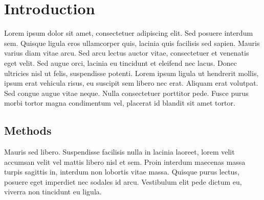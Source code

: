 \documentclass{prace}
\begin{document}
\section{Introduction}

Lorem ipsum dolor sit amet, consectetuer adipiscing elit. Sed posuere interdum
sem. Quisque ligula eros ullamcorper quis, lacinia quis facilisis sed sapien.
Mauris varius diam vitae arcu. Sed arcu lectus auctor vitae, consectetuer et
venenatis eget velit. Sed augue orci, lacinia eu tincidunt et eleifend nec
lacus. Donec ultricies nisl ut felis, suspendisse potenti. Lorem ipsum ligula
ut hendrerit mollis, ipsum erat vehicula risus, eu suscipit sem libero nec
erat. Aliquam erat volutpat. Sed congue augue vitae neque. Nulla consectetuer
porttitor pede. Fusce purus morbi tortor magna condimentum vel, placerat id
blandit sit amet tortor.

\subsection{Methods}

Mauris sed libero. Suspendisse facilisis nulla in lacinia laoreet, lorem velit
accumsan velit vel mattis libero nisl et sem. Proin interdum maecenas massa
turpis sagittis in, interdum non lobortis vitae massa. Quisque purus lectus,
posuere eget imperdiet nec sodales id arcu. Vestibulum elit pede dictum eu,
viverra non tincidunt eu ligula.

%
%
\end{document}
